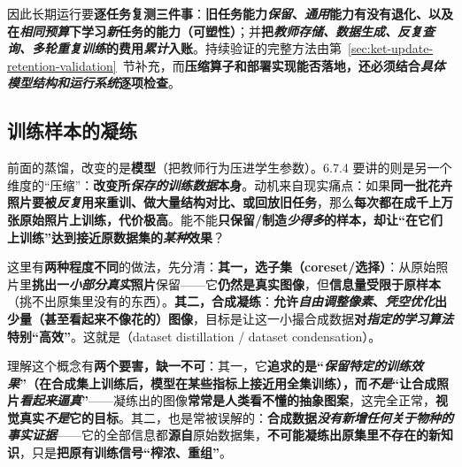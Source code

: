 因此长期运行要\textbf{逐任务复测三件事}：\textbf{旧任务能力\emph{保留}、\emph{通用}能力有没有退化、以及在\emph{相同预算}下学习\emph{新}任务的能力（可塑性）}；并\textbf{把\emph{教师存储、数据生成、反复查询、多轮重复训练}的费用\emph{累计}入账}。持续验证的完整方法由第~\ref{sec:ket-update-retention-validation}~节补充，而\textbf{压缩算子和部署实现能否落地，还必须结合\emph{具体模型结构和运行系统}逐项检查}。

\subsection{训练样本的凝练}
\label{sec:ka-sample-condensation}

前面的蒸馏，改变的是\textbf{模型}（把教师行为压进学生参数）。6.7.4 要讲的则是另一个维度的“压缩”：\textbf{改变所\emph{保存的训练数据}本身}。动机来自现实痛点：如果\textbf{同一批花卉照片要被\emph{反复}用来重训、做大量结构对比、或回放旧任务}，那么\textbf{每次都在成千上万张原始照片上训练，代价极高}。能不能\textbf{只保留/制造\emph{少得多}的样本，却让“在它们上训练”达到接近原数据集的\emph{某种}效果}？

这里有\textbf{两种程度不同}的做法，先分清：\textbf{其一，选子集（coreset/选择）}：从原始照片里\textbf{挑出一\emph{小部分真实}照片}保留——它\textbf{仍然是真实图像}，但\textbf{信息量受限于原样本}（挑不出原集里没有的东西）。\textbf{其二，合成凝练}：\textbf{允许\emph{自由调整像素}、\emph{凭空优化}出少量（甚至看起来不像花的）图像}，目标是让这一小撮合成数据\textbf{对\emph{指定的学习算法}特别“高效”}。这就是（dataset distillation / dataset condensation）。

理解这个概念有\textbf{两个要害，缺一不可}：其一，它\textbf{追求的是“\emph{保留\emph{特定}的训练\emph{效果}}”（在合成集上训练后，模型在某些指标上接近用全集训练），\textbf{而\emph{不是}}“让合成照片\emph{看起来逼真}”}——凝练出的图像\textbf{常常是人类看不懂的抽象图案}，这完全正常，\textbf{视觉真实\emph{不是}它的目标}。其二，也是常被误解的：\textbf{合成数据\emph{没有新增任何关于物种的\emph{事实证据}}}——它的全部信息都\textbf{源自}原始数据集，\textbf{不可能凝练出原集里不存在的新知识}，只是\textbf{把原有训练信号“榨浓、重组”}。

